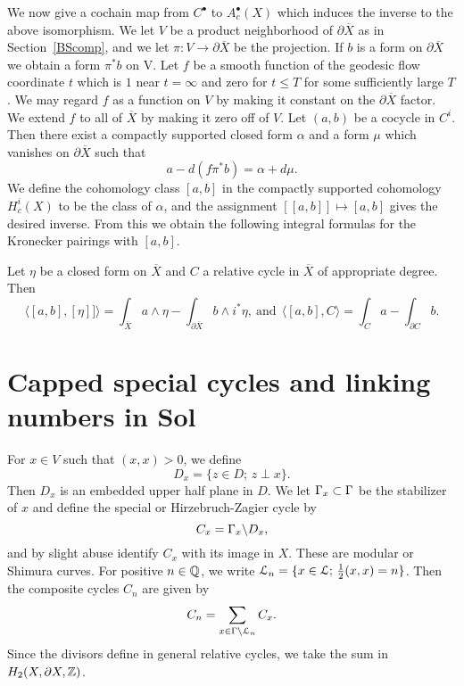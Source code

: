 We now give a cochain map from $C^{\bullet}$ to $ A_c^{\bullet}(X)$
which induces the inverse to the above isomorphism. We let $V$ be
a product neighborhood of $\partial \overline{X}$ as in
Section~\ref{BScomp}, and we let $\pi:V \to \partial \overline{X}$
be the projection. If $b$ is a form on $\partial \overline{X}$ we
obtain a form $\pi^{\ast} b$ on V. Let $f$ be a smooth function of
the geodesic flow coordinate $t$ which is $1$ near $t=\infty$ and
zero for $t \leq T$ for some sufficiently large $T$. We may regard
$f$ as a function on $V$ by making it constant on the $\partial
\overline{X}$ factor. We extend $f$ to all of $ \overline{X}$ by
making it zero off of $V$. Let $(a,b)$ be a cocycle in $C^i$. Then
there exist a compactly supported closed form $\alpha $ and a form
$\mu$ which vanishes on $\partial \overline{X}$ such that \[ a -
d(f \pi^{\ast}b ) = \alpha + d\mu.  \] We define the cohomology
class $[a,b]$ in the compactly supported  cohomology $H^i_c(X)$ to
be the class of $\alpha$, and the assignment $[[a,b]] \mapsto [a,b]$
gives the desired inverse. From this we obtain the  following
integral formulas for the Kronecker pairings with $[a,b]$.  \vskip
0.5in \begin{lemma}\label{integralformula} Let $\eta$ be a closed
form on $\overline{X}$ and $C$ a relative cycle in $\overline{X}$
of appropriate degree. Then $$ \langle[a, b], [\eta]]\rangle =
\int_{\overline{X}}a\wedge \eta - \int_{\partial \overline{X}} b
\wedge i^*\eta, \ \text{and} \ \ \langle [a,b],C \rangle =  \int_{C}a
- \int_{\partial C} b.$$ \end{lemma} \vskip 0.5in \section{Capped
special cycles and linking numbers in Sol}\label{capped-cycles}

For $x \in V$ such that $(x,x)>0$, we define \[ D_x =\{ z \in D;
\, z \perp x \}.  \] Then $D_x$ is an embedded upper half plane in
$D$. We let $\Gamma_x \subset \Gamma$ be the stabilizer of $x$ and define
the special or Hirzebruch-Zagier cycle by \[ C_x = \Gamma_x \backslash D_x,
\] and by slight abuse identify $C_x$ with its image in $X$. These
are modular or Shimura curves. For positive $n \in \mathbb{Q}$, we write
$\mathcal{L}_n = \{ x \in \mathcal{L}; \, \tfrac12(x,x)= n\}$. Then the
composite cycles $C_n$ are given by \[ C_n= \sum_{x \in \Gamma \backslash
\mathcal{L}_n} C_x.  \] Since the divisors define in general relative
cycles, we take the sum in $H_2(X,\partial X,\mathbb{Z})$.


\vskip 0.5in



